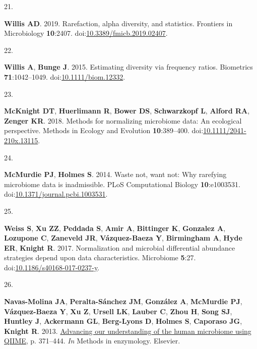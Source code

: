 \documentclass[
]{article}
\newlength{\cslhangindent}
\newlength{\csllabelwidth}
\newlength{\cslentryspacingunit} %
\newenvironment{CSLReferences}[2] %
 {%
  \setlength{\parindent}{0pt}
  \ifodd #1
  \let\oldpar\par
  \def\par{\hangindent=\cslhangindent\oldpar}
  \fi
  \setlength{\parskip}{#2\cslentryspacingunit}
 }%
 {}
\newcommand{\CSLLeftMargin}[1]{\parbox[t]{\csllabelwidth}{#1}}
\newcommand{\CSLRightInline}[1]{\parbox[t]{\linewidth - \csllabelwidth}{#1}\break}
\begin{document}
\begin{CSLReferences}{0}{1}
\leavevmode{}%
\CSLLeftMargin{21. }%
\CSLRightInline{\textbf{Willis AD}. 2019. Rarefaction, alpha diversity,
and statistics. Frontiers in Microbiology \textbf{10}:2407.
doi:\href{https://doi.org/10.3389/fmicb.2019.02407}{10.3389/fmicb.2019.02407}.}

\leavevmode{}%
\CSLLeftMargin{22. }%
\CSLRightInline{\textbf{Willis A}, \textbf{Bunge J}. 2015. Estimating
diversity via frequency ratios. Biometrics \textbf{71}:1042--1049.
doi:\href{https://doi.org/10.1111/biom.12332}{10.1111/biom.12332}.}

\leavevmode{}%
\CSLLeftMargin{23. }%
\CSLRightInline{\textbf{McKnight DT}, \textbf{Huerlimann R},
\textbf{Bower DS}, \textbf{Schwarzkopf L}, \textbf{Alford RA},
\textbf{Zenger KR}. 2018. Methods for normalizing microbiome data: An
ecological perspective. Methods in Ecology and Evolution
\textbf{10}:389--400.
doi:\href{https://doi.org/10.1111/2041-210x.13115}{10.1111/2041-210x.13115}.}

\leavevmode{}%
\CSLLeftMargin{24. }%
\CSLRightInline{\textbf{McMurdie PJ}, \textbf{Holmes S}. 2014. Waste
not, want not: Why rarefying microbiome data is inadmissible. {PLoS}
Computational Biology \textbf{10}:e1003531.
doi:\href{https://doi.org/10.1371/journal.pcbi.1003531}{10.1371/journal.pcbi.1003531}.}

\leavevmode{}%
\CSLLeftMargin{25. }%
\CSLRightInline{\textbf{Weiss S}, \textbf{Xu ZZ}, \textbf{Peddada S},
\textbf{Amir A}, \textbf{Bittinger K}, \textbf{Gonzalez A},
\textbf{Lozupone C}, \textbf{Zaneveld JR}, \textbf{Vázquez-Baeza Y},
\textbf{Birmingham A}, \textbf{Hyde ER}, \textbf{Knight R}. 2017.
Normalization and microbial differential abundance strategies depend
upon data characteristics. Microbiome \textbf{5}:27.
doi:\href{https://doi.org/10.1186/s40168-017-0237-y}{10.1186/s40168-017-0237-y}.}

\leavevmode{}%
\CSLLeftMargin{26. }%
\CSLRightInline{\textbf{Navas-Molina JA}, \textbf{Peralta-Sánchez JM},
\textbf{González A}, \textbf{McMurdie PJ}, \textbf{Vázquez-Baeza Y},
\textbf{Xu Z}, \textbf{Ursell LK}, \textbf{Lauber C}, \textbf{Zhou H},
\textbf{Song SJ}, \textbf{Huntley J}, \textbf{Ackermann GL},
\textbf{Berg-Lyons D}, \textbf{Holmes S}, \textbf{Caporaso JG},
\textbf{Knight R}. 2013.
\href{https://doi.org/10.1016/b978-0-12-407863-5.00019-8}{Advancing our
understanding of the human microbiome using {QIIME}}, p. 371--444.
\emph{In} Methods in enzymology. Elsevier.}


\end{CSLReferences}
\end{document}
